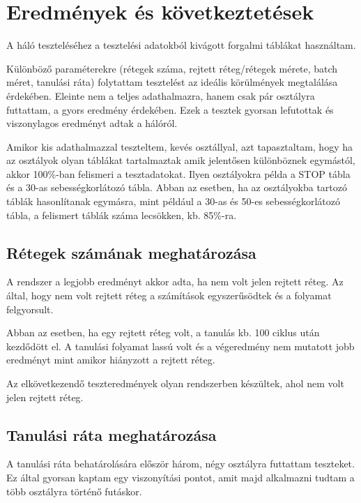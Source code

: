 \chapter{Eredmények és következtetések}\label{ch:eredmenyek}

A háló teszteléséhez a tesztelési adatokból kivágott forgalmi táblákat használtam. 

Különböző paraméterekre (rétegek száma, rejtett réteg/rétegek mérete, batch méret, tanulási ráta) folytattam tesztelést az ideális körülmények megtalálása érdekében. Eleinte nem a teljes adathalmazra, hanem csak pár osztályra futtattam, a gyors eredmény érdekében. Ezek a tesztek gyorsan lefutottak és viszonylagos eredményt adtak a hálóról.

Amikor kis adathalmazzal teszteltem, kevés osztállyal, azt tapasztaltam, hogy ha az osztályok olyan táblákat tartalmaztak amik jelentősen különböznek egymástól, akkor 100\%-ban felismeri a tesztadatokat. Ilyen osztályokra példa a STOP tábla és a 30-as sebességkorlátozó tábla. Abban az esetben, ha az osztályokba tartozó táblák hasonlítanak egymásra, mint például a 30-as és 50-es sebességkorlátozó tábla, a felismert táblák száma lecsökken, kb. 85\%-ra.

\section{Rétegek számának meghatározása}

A rendszer a legjobb eredményt akkor adta, ha nem volt jelen rejtett réteg. Az által, hogy nem volt rejtett réteg a számítások egyszerűsödtek és a folyamat felgyorsult.

Abban az esetben, ha egy rejtett réteg volt, a tanulás kb. 100 ciklus után kezdődött el. A tanulási folyamat lassú volt és a végeredmény nem mutatott jobb eredményt mint amikor hiányzott a rejtett réteg.

Az elkövetkezendő teszteredmények olyan rendszerben készültek, ahol nem volt jelen rejtett réteg.

\section{Tanulási ráta meghatározása}

A tanulási ráta behatárolására először három, négy osztályra futtattam teszteket. Ez által gyorsan kaptam egy viszonyítási pontot, amit majd alkalmazni tudtam a több osztályra történő futáskor.

